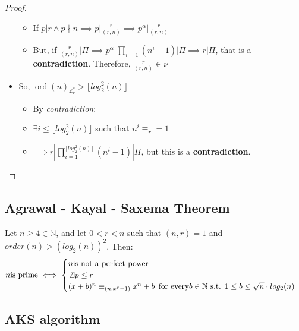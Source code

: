\begin{proof}
\begin{itemize}
\begin{itemize}
            \item If $p | r \land p \nmid n \implies p | \frac{r}{(r,n)} \implies p^{\alpha} | \frac{r}{(r,n)}$
            \item But, if $\frac{r}{(r,n)} | \Pi \implies p^{\alpha} | \prod_{i=1}^{\dots} (n^{i} - 1) | \Pi \implies r | \Pi$, that is a \textbf{contradiction}. Therefore, $\frac{r}{(r,n)} \in \nu$
        \end{itemize}
        \item So, $\operatorname{ord}(n)_{\mathbb{Z}_{r}^{*}} > \lfloor log_{2}^{2}(n) \rfloor$
        \begin{itemize}
            \item By \emph{contradiction}:
            \item $\exists i \leq \lfloor log_{2}^{2}(n) \rfloor$ such that $n^{i} \equiv_{r} = 1$
            \item $\implies r | \prod_{i = 1}^{\lfloor log_{2}^{2}(n) \rfloor}(n^{i} - 1) | \Pi$, but this is a \textbf{contradiction}.
        \end{itemize}

    \end{itemize}
\end{proof}

\subsection{Agrawal - Kayal - Saxema Theorem}
\begin{theorem}\label{aks_theorem}
    Let $n \geq 4 \in \mathbb{N}$, and let $0 < r < n$ such that $(n,r) = 1$ and $order(n) > (log_{2}(n))^{2}$. Then:
    \[
    n \text{is prime} \iff
         \begin{cases}
           n \text{is not a perfect power} \\
           \not\exists p \leq r \\
           (x + b)^{n} \equiv_{(n, x^{r} - 1)} x^{n} + b \text{\, for every} b \in \mathbb{N} \text{ s.t. } 1 \leq b \leq \sqrt{n} \cdot log_{2}(n)
         \end{cases}
    \]
\end{theorem}

\subsection{AKS algorithm}
